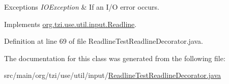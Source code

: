 \begin{DoxyExceptions}{Exceptions}
{\em I\-O\-Exception} & If an I/\-O error occurs. \\
\hline
\end{DoxyExceptions}


Implements \hyperlink{interfaceorg_1_1tzi_1_1use_1_1util_1_1input_1_1_readline_adbdefac48fea8074c4294e564951a9cf}{org.\-tzi.\-use.\-util.\-input.\-Readline}.



Definition at line 69 of file Readline\-Test\-Readline\-Decorator.\-java.



The documentation for this class was generated from the following file\-:\begin{DoxyCompactItemize}
\item 
src/main/org/tzi/use/util/input/\hyperlink{_readline_test_readline_decorator_8java}{Readline\-Test\-Readline\-Decorator.\-java}\end{DoxyCompactItemize}
